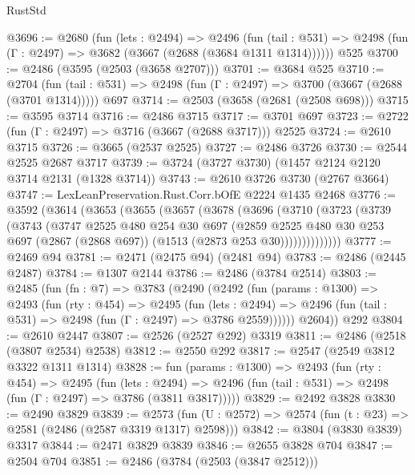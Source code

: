 \begin{lexlean}{RustStd}
\begin{coremodule}
@3696 := @2680
    (fun (lets : @2494) =>
    @2496
      (fun (tail : @531) => @2498 (fun (Γ : @2497) => @3682 (@3667 (@2688 (@3684 @1311 @1314))))))
    @525
@3700 := @2486 (@3595 (@2503 (@3658 @2707)))
@3701 := @3684 @525
@3710 := @2704
    (fun (tail : @531) => @2498 (fun (Γ : @2497) => @3700 (@3667 (@2688 (@3701 @1314)))))
    @697
@3714 := @2503 (@3658 (@2681 (@2508 @698)))
@3715 := @3595 @3714
@3716 := @2486 @3715
@3717 := @3701 @697
@3723 := @2722 (fun (Γ : @2497) => @3716 (@3667 (@2688 @3717))) @2525
@3724 := @2610 @3715
@3726 := @3665 (@2537 @2525)
@3727 := @2486 @3726
@3730 := @2544 @2525 @2687 @3717
@3739 := @3724 (@3727 @3730) (@1457 @2124 @2120 @3714 @2131 (@1328 @3714))
@3743 := @2610 @3726 @3730 (@2767 @3664)
@3747 := LexLeanPreservation.Rust.Corr.bOfE @2224 @1435 @2468
@3776 := @3592
    (@3614
      (@3653
        (@3655
          (@3657
            (@3678
              (@3696
                (@3710
                  (@3723
                    (@3739
                      (@3743
                        (@3747
                          @2525
                          @480
                          @254
                          @30
                          @697
                          (@2859
                            @2525
                            @480
                            @30
                            @253
                            @697
                            (@2867 (@2868 @697))
                            (@1513 (@2873 @253 @30))))))))))))))
@3777 := @2469 @94
@3781 := @2471 (@2475 @94) (@2481 @94)
@3783 := @2486 (@2445 @2487)
@3784 := @1307 @2144
@3786 := @2486 (@3784 @2514)
@3803 := @2485
    (fun (fn : @7) =>
    @3783
      (@2490
        (@2492
          (fun (params : @1300) =>
          @2493
            (fun (rty : @454) =>
            @2495
              (fun (lets : @2494) =>
              @2496 (fun (tail : @531) => @2498 (fun (Γ : @2497) => @3786 @2559))))))
        @2604))
    @292
@3804 := @2610 @2447
@3807 := @2526 (@2527 @292) @3319
@3811 := @2486 (@2518 (@3807 @2534) @2538)
@3812 := @2550 @292
@3817 := @2547 (@2549 @3812 @3322 @1311 @1314)
@3828 := fun (params : @1300) =>
  @2493
    (fun (rty : @454) =>
    @2495
      (fun (lets : @2494) =>
      @2496 (fun (tail : @531) => @2498 (fun (Γ : @2497) => @3786 (@3811 @3817)))))
@3829 := @2492 @3828
@3830 := @2490 @3829
@3839 := @2573 (fun (U : @2572) => @2574 (fun (t : @23) => @2581 (@2486 (@2587 @3319 @1317) @2598)))
@3842 := @3804 (@3830 @3839) @3317
@3844 := @2471 @3829 @3839
@3846 := @2655 @3828 @704
@3847 := @2504 @704
@3851 := @2486 (@3784 (@2503 (@3847 @2512)))

\end{coremodule}
\end{lexlean}
